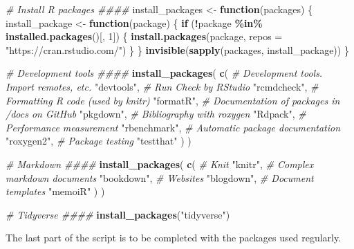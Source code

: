 \documentclass[
  12pt,
  american,
  a4paper,
  extrafontsizes,onecolumn,openright
  ]{memoir}
\newenvironment{Shaded}{\begin{snugshade}}{\end{snugshade}}
\newcommand{\AttributeTok}[1]{\textcolor[rgb]{0.13,0.29,0.53}{#1}}
\newcommand{\CommentTok}[1]{\textcolor[rgb]{0.56,0.35,0.01}{\textit{#1}}}
\newcommand{\ControlFlowTok}[1]{\textcolor[rgb]{0.13,0.29,0.53}{\textbf{#1}}}
\newcommand{\DecValTok}[1]{\textcolor[rgb]{0.00,0.00,0.81}{#1}}
\newcommand{\FunctionTok}[1]{\textcolor[rgb]{0.13,0.29,0.53}{\textbf{#1}}}
\newcommand{\NormalTok}[1]{#1}
\newcommand{\OtherTok}[1]{\textcolor[rgb]{0.56,0.35,0.01}{#1}}
\newcommand{\SpecialCharTok}[1]{\textcolor[rgb]{0.81,0.36,0.00}{\textbf{#1}}}
\newcommand{\StringTok}[1]{\textcolor[rgb]{0.31,0.60,0.02}{#1}}
\newlength{\rf}
\begin{document}
\begin{Shaded}
\begin{Highlighting}[]
\CommentTok{\# Install R packages \#\#\#\#}
\NormalTok{install\_packages }\OtherTok{\textless{}{-}} \ControlFlowTok{function}\NormalTok{(packages) \{}
\NormalTok{  install\_package }\OtherTok{\textless{}{-}} \ControlFlowTok{function}\NormalTok{(package) \{}
    \ControlFlowTok{if}\NormalTok{ (}\SpecialCharTok{!}\NormalTok{package }\SpecialCharTok{\%in\%} \FunctionTok{installed.packages}\NormalTok{()[, }\DecValTok{1}\NormalTok{]) \{}
      \FunctionTok{install.packages}\NormalTok{(package, }\AttributeTok{repos =} \StringTok{"https://cran.rstudio.com/"}\NormalTok{)}
\NormalTok{    \}}
\NormalTok{  \}}
  \FunctionTok{invisible}\NormalTok{(}\FunctionTok{sapply}\NormalTok{(packages, install\_package))}
\NormalTok{\}}

\CommentTok{\# Development tools \#\#\#\#}
\FunctionTok{install\_packages}\NormalTok{(}
  \FunctionTok{c}\NormalTok{(}
    \CommentTok{\# Development tools. Import remotes, etc.}
    \StringTok{"devtools"}\NormalTok{,}
    \CommentTok{\# Run Check by RStudio}
    \StringTok{"rcmdcheck"}\NormalTok{,}
    \CommentTok{\# Formatting R code (used by knitr)}
    \StringTok{"formatR"}\NormalTok{,}
    \CommentTok{\# Documentation of packages in /docs on GitHub}
    \StringTok{"pkgdown"}\NormalTok{,}
    \CommentTok{\# Bibliography with roxygen}
    \StringTok{"Rdpack"}\NormalTok{,}
    \CommentTok{\# Performance measurement}
    \StringTok{"rbenchmark"}\NormalTok{,}
    \CommentTok{\# Automatic package documentation}
    \StringTok{"roxygen2"}\NormalTok{,}
    \CommentTok{\# Package testing}
    \StringTok{"testthat"}
\NormalTok{  )}
\NormalTok{)}

\CommentTok{\# Markdown \#\#\#\#}
\FunctionTok{install\_packages}\NormalTok{(}
  \FunctionTok{c}\NormalTok{(}
    \CommentTok{\# Knit}
    \StringTok{"knitr"}\NormalTok{,}
    \CommentTok{\# Complex markdown documents}
    \StringTok{"bookdown"}\NormalTok{,}
    \CommentTok{\# Websites}
    \StringTok{"blogdown"}\NormalTok{,}
    \CommentTok{\# Document templates}
    \StringTok{"memoiR"}
\NormalTok{  )}
\NormalTok{)}

\CommentTok{\# Tidyverse \#\#\#\#}
\FunctionTok{install\_packages}\NormalTok{(}\StringTok{"tidyverse"}\NormalTok{)}
\end{Highlighting}
\end{Shaded}

\normalsize

The last part of the script is to be completed with the packages used regularly.
\end{document}
